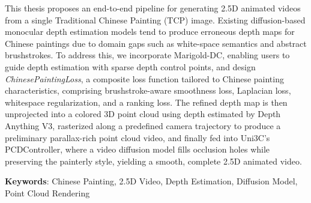This thesis proposes an end-to-end pipeline for generating 2.5D animated videos from a single
Traditional Chinese Painting (TCP) image.
Existing diffusion-based monocular depth estimation models tend to produce erroneous depth maps
for Chinese paintings due to domain gaps such as white-space semantics and abstract brushstrokes.
To address this, we incorporate Marigold-DC, enabling users to guide depth estimation with
sparse depth control points, and design \textit{ChinesePaintingLoss}, a composite loss function
tailored to Chinese painting characteristics, comprising brushstroke-aware smoothness loss,
Laplacian loss, whitespace regularization, and a ranking loss.
The refined depth map is then unprojected into a colored 3D point cloud using depth
estimated by Depth Anything V3, rasterized along a predefined camera trajectory to produce a
preliminary parallax-rich point cloud video, and finally fed into Uni3C's PCDController, where a video
diffusion model fills occlusion holes while preserving the painterly style, yielding a smooth,
complete 2.5D animated video.

\begin{flushleft}
{\bf Keywords}: Chinese Painting, 2.5D Video, Depth Estimation, Diffusion Model, Point Cloud Rendering
\end{flushleft}